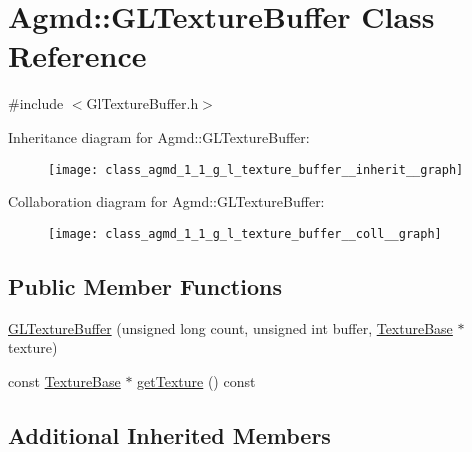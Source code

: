 \hypertarget{class_agmd_1_1_g_l_texture_buffer}{\section{Agmd\+:\+:G\+L\+Texture\+Buffer Class Reference}
\label{class_agmd_1_1_g_l_texture_buffer}
}


{\ttfamily \#include $<$Gl\+Texture\+Buffer.\+h$>$}



Inheritance diagram for Agmd\+:\+:G\+L\+Texture\+Buffer\+:\nopagebreak
\begin{figure}[H]
\begin{center}
\leavevmode
\texttt{[image: class\_agmd\_1\_1\_g\_l\_texture\_buffer\_\_inherit\_\_graph]}
\end{center}
\end{figure}


Collaboration diagram for Agmd\+:\+:G\+L\+Texture\+Buffer\+:\nopagebreak
\begin{figure}[H]
\begin{center}
\leavevmode
\texttt{[image: class\_agmd\_1\_1\_g\_l\_texture\_buffer\_\_coll\_\_graph]}
\end{center}
\end{figure}
\subsection*{Public Member Functions}
\begin{DoxyCompactItemize}
\item 
\hyperlink{class_agmd_1_1_g_l_texture_buffer_ab13ee278586477fc73f039b4616e028c}{G\+L\+Texture\+Buffer} (unsigned long count, unsigned int buffer, \hyperlink{class_agmd_1_1_texture_base}{Texture\+Base} $\ast$texture)
\item 
const \hyperlink{class_agmd_1_1_texture_base}{Texture\+Base} $\ast$ \hyperlink{class_agmd_1_1_g_l_texture_buffer_a2a04d914b361a2255894fbe7c38623a8}{get\+Texture} () const 
\end{DoxyCompactItemize}
\subsection*{Additional Inherited Members}


